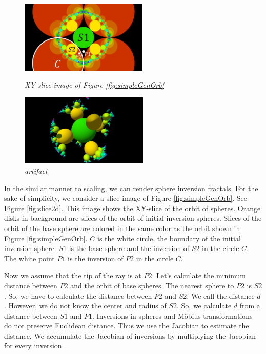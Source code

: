 \begin{figure}[htbp]
 \begin{minipage}[t]{0.5\hsize}
  \center
  \includegraphics[height=1.35in, keepaspectratio]{img/preparation/slice.png}
  \caption{\textit{XY-slice image of Figure \ref{fig:simpleGenOrb}}}
  \label{fig:slice2d}
  \hspace*{\fill}
 \end{minipage}
 \begin{minipage}[t]{0.5\hsize}
  \center
  \includegraphics[height=1.35in, keepaspectratio]{img/preparation/artifact.pdf}
  \caption{\textit{artifact}}
  \label{fig:3dartifact}
  \hspace*{\fill}
 \end{minipage}
\end{figure}

In the similar manner to scaling, we can render sphere inversion
fractals.
For the sake of simplicity, we consider a slice image of Figure
\ref{fig:simpleGenOrb}.
See Figure \ref{fig:slice2d}. This image shows the XY-slice of the orbit
of spheres.
Orange disks in background  are slices of the orbit of initial inversion spheres.
Slices of the orbit of the base sphere are colored in
the same color as the orbit shown in Figure \ref{fig:simpleGenOrb}.
$C$ is the white circle, the boundary of the initial inversion sphere.
$S1$ is the base sphere and the inversion of $S2$ in the circle $C$. 
The white point $P1$ is the inversion of $P2$ in the circle $C$.

Now we assume that the tip of the ray is at $P2$.
Let's calculate the minimum distance between
$P2$ and the orbit of base spheres.
The nearest sphere to $P2$ is $S2$.
So, we have to calculate the distance between $P2$ and $S2$.
We call the distance $d$.
However, we do not know the center and radius of $S2$.
So, we calculate $d$ from a distance between $S1$ and $P1$.
Inversions in spheres and M\"obius transformations do not preserve
Euclidean distance.
Thus we use the Jacobian to estimate the distance.
We accumulate the Jacobian of inversions by multiplying the Jacobian for
every inversion.


